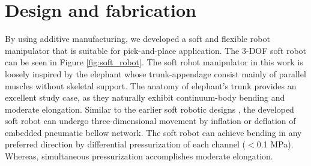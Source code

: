%

\section{Design and fabrication}
By using additive manufacturing, we developed a soft and flexible robot manipulator that is suitable for pick-and-place application. The 3-DOF soft robot can be seen in Figure \ref{fig:soft_robot}. The soft robot manipulator in this work is loosely inspired by the elephant whose trunk-appendage consist mainly of parallel muscles without skeletal support. The anatomy of elephant's trunk provides an excellent study case, as they naturally exhibit continuum-body bending and moderate elongation\cite{Falkenhahn2015,Jones2006,Tatlicioglu2007}.
%
Similar to the earlier soft robotic designs \cite{Suzumori1991,Falkenhahn2015}, the developed soft robot can undergo three-dimensional movement by inflation or deflation of embedded pneumatic bellow network. The soft robot can achieve bending in any preferred direction by differential pressurization of each channel ($<$0.1 MPa). Whereas, simultaneous pressurization accomplishes moderate elongation.

